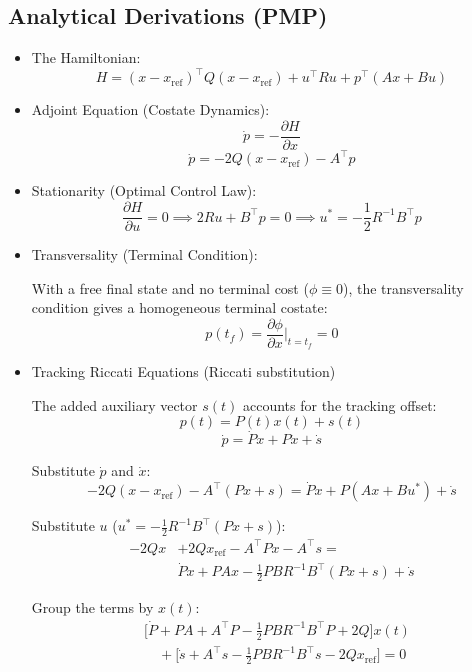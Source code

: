 \documentclass[letterpaper, 10 pt, conference]{ieeeconf}
\begin{document}
\subsection{Analytical Derivations (PMP)}

\begin{itemize}

    \item The Hamiltonian:
    \[H = (x - x_{\text{ref}})^\top Q (x - x_{\text{ref}}) + u^\top R u + p^\top (Ax + Bu)\]
    
    \item Adjoint Equation (Costate Dynamics):
    \[\dot{p} = -\frac{\partial H}{\partial x}\] 
    \[\dot{p} = -2Q(x - x_{\text{ref}}) - A^\top p \]
    
    \item Stationarity (Optimal Control Law):
    \[\frac{\partial H}{\partial u} = 0 \implies 2Ru + B^\top p = 0 \implies u^* = -\frac{1}{2} R^{-1} B^\top p\]
    
    \item Transversality (Terminal Condition):

        With a free final state and no terminal cost ($\phi \equiv 0$), the transversality condition gives a homogeneous terminal costate:
    \[p(t_f) = \frac{\partial \phi}{\partial x} \bigg|_{t=t_f} = 0 \]
    
    \item Tracking Riccati Equations (Riccati substitution)
    
        The added auxiliary vector $s(t)$ accounts for the tracking offset:
        \[p(t) = P(t)x(t) + s(t)\]
        \[\dot{p} = \dot{P}x + P\dot{x} + \dot{s}\]
    
        Substitute $\dot{p}$ and $\dot{x}$:
        \[-2Q(x - x_{\text{ref}}) - A^\top(Px + s) = \dot{P}x + P(Ax + Bu^*) + \dot{s}\]
    
        Substitute $u$ ($u^* = -\frac{1}{2}R^{-1}B^\top(Px + s)$):
        \[
            \begin{aligned}
            -2Qx &+ 2Qx_{\text{ref}} - A^\top P x - A^\top s ={} \\
            &\dot{P}x + PAx - \tfrac{1}{2}P B R^{-1} B^\top (Px + s) + \dot{s}
            \end{aligned}
        \]
        
        Group the terms by $x(t)$:
        \[
            \begin{split}
            &\Big[ \dot{P} + PA + A^\top P - \tfrac{1}{2}PBR^{-1}B^\top P + 2Q \Big] x(t) \\
            &\quad + \Big[ \dot{s} + A^\top s - \tfrac{1}{2}PBR^{-1}B^\top s - 2Qx_{\text{ref}} \Big] = 0
            \end{split}
        \]
    

\end{itemize}
\end{document}

